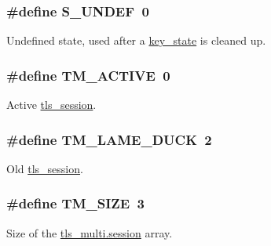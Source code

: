 \subsubsection[{S\+\_\+\+U\+N\+D\+E\+F}]{\setlength{\rightskip}{0pt plus 5cm}\#define S\+\_\+\+U\+N\+D\+E\+F~0}\label{group__control__processor_ga5c620f0ab83a389abc17d80bfb1e0665}
Undefined state, used after a {\ttfamily \hyperlink{structkey__state}{key\+\_\+state}} is cleaned up. \hypertarget{group__control__processor_gad3c70b02a0ca4537fba1d53802e1e429}{}
\subsubsection[{T\+M\+\_\+\+A\+C\+T\+I\+V\+E}]{\setlength{\rightskip}{0pt plus 5cm}\#define T\+M\+\_\+\+A\+C\+T\+I\+V\+E~0}\label{group__control__processor_gad3c70b02a0ca4537fba1d53802e1e429}
Active {\ttfamily \hyperlink{structtls__session}{tls\+\_\+session}}. \hypertarget{group__control__processor_ga89d765b434597e7194131ace44c605af}{}
\subsubsection[{T\+M\+\_\+\+L\+A\+M\+E\+\_\+\+D\+U\+C\+K}]{\setlength{\rightskip}{0pt plus 5cm}\#define T\+M\+\_\+\+L\+A\+M\+E\+\_\+\+D\+U\+C\+K~2}\label{group__control__processor_ga89d765b434597e7194131ace44c605af}
Old {\ttfamily \hyperlink{structtls__session}{tls\+\_\+session}}. \hypertarget{group__control__processor_gaa195349d22c113d3acc88b6795e491b8}{}
\subsubsection[{T\+M\+\_\+\+S\+I\+Z\+E}]{\setlength{\rightskip}{0pt plus 5cm}\#define T\+M\+\_\+\+S\+I\+Z\+E~3}\label{group__control__processor_gaa195349d22c113d3acc88b6795e491b8}
Size of the {\ttfamily \hyperlink{structtls__multi_a74e065e432f819307a830ef38d5be73c}{tls\+\_\+multi.\+session}} array. \hypertarget{group__control__processor_ga6575a67494af1ca3e9608941e12a5386}{}

